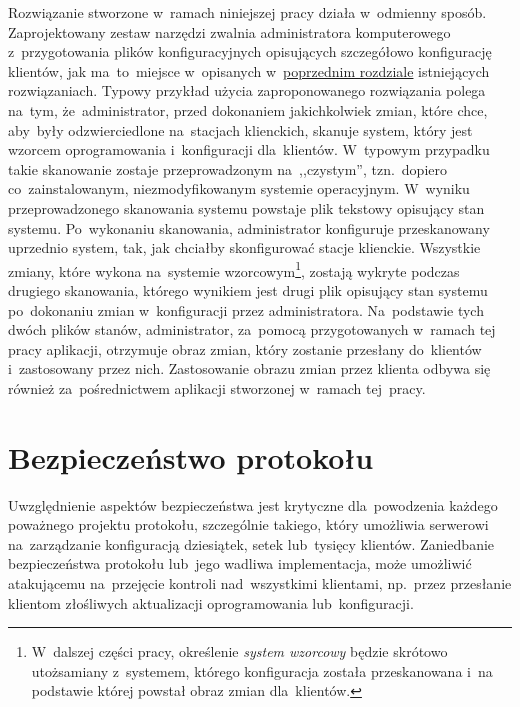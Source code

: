\documentclass[thesis]{subfiles}
\begin{document}
Rozwiązanie stworzone w~ramach niniejszej pracy działa w~odmienny sposób. Zaprojektowany zestaw narzędzi zwalnia administratora komputerowego z~przygotowania plików konfiguracyjnych opisujących szczegółowo konfigurację klientów, jak ma~to~miejsce w~opisanych w~\hyperref[ch:istniejace-rozwiazania]{poprzednim rozdziale} istniejących rozwiązaniach. Typowy przykład użycia zaproponowanego rozwiązania polega na~tym, że~administrator, przed dokonaniem jakichkolwiek zmian, które chce, aby~były odzwierciedlone na~stacjach klienckich, skanuje system, który jest wzorcem oprogramowania i~konfiguracji dla~klientów. W~typowym przypadku takie skanowanie zostaje przeprowadzonym na~,,czystym'', tzn.~dopiero co~zainstalowanym, niezmodyfikowanym systemie operacyjnym. W~wyniku przeprowadzonego skanowania systemu powstaje plik tekstowy opisujący stan systemu. Po~wykonaniu skanowania, administrator konfiguruje przeskanowany uprzednio system, tak, jak chciałby skonfigurować stacje klienckie. Wszystkie zmiany, które wykona na~systemie wzorcowym\footnote{W~dalszej części pracy, określenie \emph{system wzorcowy} będzie skrótowo utożsamiany z~systemem, którego konfiguracja została przeskanowana i~na podstawie której powstał obraz zmian dla~klientów.}, zostają wykryte podczas drugiego skanowania, którego wynikiem jest drugi plik opisujący stan systemu po~dokonaniu zmian w~konfiguracji przez administratora. Na~podstawie tych dwóch plików stanów, administrator, za~pomocą przygotowanych w~ramach tej pracy aplikacji, otrzymuje obraz zmian, który zostanie przesłany do~klientów i~zastosowany przez nich. Zastosowanie obrazu zmian przez klienta odbywa się również za~pośrednictwem aplikacji stworzonej w~ramach tej~pracy.


\section{Bezpieczeństwo protokołu}
\label{sec:security}

Uwzględnienie aspektów bezpieczeństwa jest krytyczne dla~powodzenia każdego poważnego projektu protokołu, szczególnie takiego, który umożliwia serwerowi na~zarządzanie konfiguracją dziesiątek, setek lub~tysięcy klientów. Zaniedbanie bezpieczeństwa protokołu lub~jego wadliwa implementacja, może umożliwić atakującemu na~przejęcie kontroli nad~wszystkimi klientami, np.~przez przesłanie klientom złośliwych aktualizacji oprogramowania lub~konfiguracji.
\end{document}

